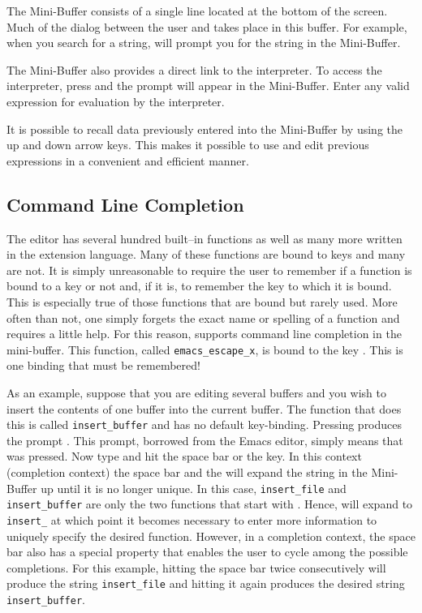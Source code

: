   The Mini-Buffer consists of a single line located at the bottom of the
  screen. Much of the dialog between the user and \jed{} takes place in this
  buffer.  For example, when you search for a string, \jed{} will prompt you
  for the string in the Mini-Buffer.

  The Mini-Buffer also provides a direct link to the \slang{} interpreter. To
  access the interpreter, press   and the 
  prompt will appear in the Mini-Buffer.  Enter any valid \slang{} expression
  for evaluation by the interpreter.

  It is possible to recall data previously entered into the Mini-Buffer by
  using the up and down arrow keys.  This makes it possible to use and edit
  previous expressions in a convenient and efficient manner.

\subsection{Command Line Completion}

  The \jed{} editor has several hundred built--in functions as well as many
  more written in the \slang{} extension language.  Many of these functions
  are bound to keys and many are not.  It is simply unreasonable to require
  the user to remember if a function is bound to a key or not and, if it is,
  to remember the key to which it is bound. This is especially true of those
  functions that are bound but rarely used.  More often than not, one simply
  forgets the exact name or spelling of a function and requires a little
  help.  For this reason, \jed{} supports command line completion in the
  mini-buffer.  This function, called \verb|emacs_escape_x|, is bound to the
  key . This is one binding that must be remembered!

  As an example, suppose that you are editing several buffers and you wish
  to insert the contents of one buffer into the current buffer.  The
  function that does this is called \verb|insert_buffer| and has no default
  key-binding. Pressing  produces the prompt . This
  prompt, borrowed from the Emacs editor, simply means that 
  was pressed.  Now type  and hit the space bar or the 
  key. In this context (completion context) the space bar and the 
  will expand the string in the Mini-Buffer up until it is no longer unique.
  In this case, \verb|insert_file| and \verb|insert_buffer| are only the two
  functions that start with .  Hence,  will expand to
  \verb|insert_| at which point it becomes necessary to enter more
  information to uniquely specify the desired function.  However, in a
  completion context, the space bar also has a special property that enables
  the user to cycle among the possible completions.  For this example,
  hitting the space bar twice consecutively will produce the string
  \verb|insert_file| and hitting it again produces the desired string
  \verb|insert_buffer|.

